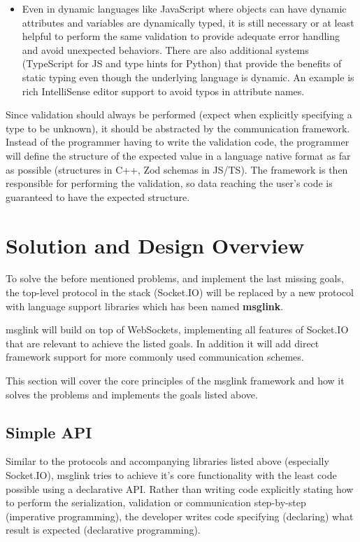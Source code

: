 \documentclass[conference]{IEEEtran}
\begin{document}
\begin{enumerate}
\begin{itemize}
        \item Even in dynamic languages like JavaScript where objects can have dynamic attributes and variables are dynamically typed, it is still necessary or at least helpful to perform the same validation to provide adequate error handling and avoid unexpected behaviors. There are also additional systems (TypeScript for JS and type hints for Python) that provide the benefits of static typing even though the underlying language is dynamic. An example is rich IntelliSense editor support to avoid typos in attribute names.
    \end{itemize}
    Since validation should always be performed (expect when explicitly specifying a type to be unknown), it should be abstracted by the communication framework. Instead of the programmer having to write the validation code, the programmer will define the structure of the expected value in a language native format as far as possible (structures in C++, Zod schemas in JS/TS). The framework is then responsible for performing the validation, so data reaching the user's code is guaranteed to have the expected structure.
\end{enumerate}


\section{Solution and Design Overview}

To solve the before mentioned problems, and implement the last missing goals, the top-level protocol in the stack (Socket.IO) will be replaced by a new protocol with language support libraries which has been named \textbf{msglink}.

msglink will build on top of WebSockets, implementing all features of Socket.IO that are relevant to achieve the listed goals. In addition it will add direct framework support for more commonly used communication schemes.

This section will cover the core principles of the msglink framework and how it solves the problems and implements the goals listed above.

\subsection{Simple API}

Similar to the protocols and accompanying libraries listed above (especially Socket.IO), msglink tries to achieve it's core functionality with the least code possible using a declarative API. Rather than writing code explicitly stating how to perform the serialization, validation or communication step-by-step (imperative programming), the developer writes code specifying (declaring) what result is expected (declarative programming).
\end{document}

